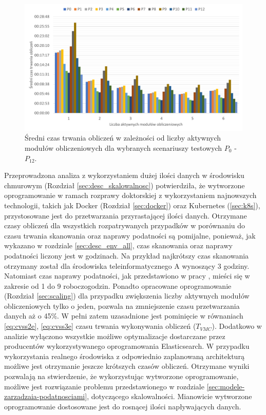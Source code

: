 \begin{figure}[!ht]
\centering
\includegraphics[width=.9\textwidth]{Chapters/Eksperymenty/scaling_results/p_proces.pdf}
\caption{Średni czas trwania obliczeń w zależności od liczby aktywnych modułów obliczeniowych dla wybranych scenariuszy testowych $P_0$ - $P_{12}$.}
\label{fig:chapter6:p_process}
\end{figure}


\bigbreak
Przeprowadzona analiza z wykorzystaniem dużej ilości danych w środowisku chmurowym (Rozdział \ref{sec:desc_skalowalnosc}) potwierdziła, że wytworzone oprogramowanie w ramach rozprawy doktorskiej z wykorzystaniem najnowszych technologii, takich jak Docker (Rozdział \ref{sec:docker}) oraz Kubernetes (\ref{sec:k8s}), przystosowane jest do przetwarzania przyrastającej ilości danych. Otrzymane czasy obliczeń dla wszystkich rozpatrywanych przypadków w porównaniu do czasu trwania skanowania oraz naprawy podatności są pomijalne, ponieważ, jak wykazano w rozdziale \ref{sec:desc_env_all}, czas skanowania oraz naprawy podatności liczony jest w godzinach. Na przykład najkrótszy czas skanowania otrzymany został dla środowiska teleinformatycznego A wynoszący 3 godziny. Natomiast czas naprawy podatności, jak przedstawiono w pracy \cite{farris2018vulcon}, mieści się w zakresie od 1 do 9 roboczogodzin. Ponadto opracowane oprogramowanie (Rozdział \ref{sec:scaling}) dla przypadku zwiększenia liczby aktywnych modułów obliczeniowych tylko o jeden, pozwala na zmniejszenie czasu przetwarzania danych aż o 45\%. W pełni zatem uzasadnione jest pominięcie w równaniach \ref{eq:cvss2e}, \ref{eq:cvss3e} czasu trwania wykonywania obliczeń ($T_{VMC}$). Dodatkowo w analizie wyłączono wszystkie możliwe optymalizacje dostarczane przez producentów wykorzystywanego oprogramowania Elasticsearch. W przypadku wykorzystania realnego środowiska z odpowiednio zaplanowaną architekturą możliwe jest otrzymanie jeszcze krótszych czasów obliczeń. Otrzymane wyniki pozwalają na stwierdzenie, że wykorzystując wytworzone oprogramowanie, możliwe jest rozwiązanie problemu przedstawionego w rozdziale \ref{sec:modele-zarzadzaia-podatnosciami}, dotyczącego skalowalności. Mianowicie wytworzone oprogramowanie dostosowane jest do rosnącej ilości napływających danych.

